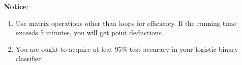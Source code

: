 \documentclass[a4paper, 12pt, answers]{exam}
\begin{document}
\nocite{*}
\begin{flushleft}
\textbf{Notice}: \\
\begin{enumerate}
\item Use matrix operations other than loops for efficiency. If the running time exceeds 5 minutes, you will get point deductions.
\item You are ought to acquire at leat $95\%$ test accuracy in your logistic binary classifier. 
\end{enumerate}
\end{flushleft}



\end{document}
